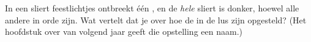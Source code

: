 \begin{exercise}[$\star\star$]\label{exo:g3:first-electric-circuit:11}
In een sliert feestlichtjes ontbreekt één , en de \emph{hele}
sliert is donker, hoewel alle andere  in orde zijn. Wat
vertelt dat je over hoe de  in de lus zijn opgesteld? (Het
hoofdstuk over  van volgend jaar geeft die opstelling een
naam.)
\end{exercise}
